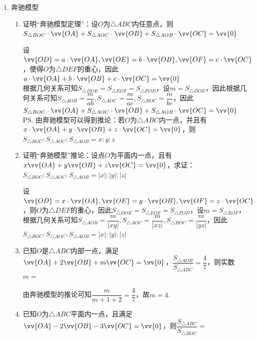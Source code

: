 \begin{enumerate}
\begin{enumerate}
    \end{enumerate}
    \item 奔驰模型
    \begin{enumerate}
        \item 证明“奔驰模型定理”：设$O$为$\triangle ABC$内任意点，则$S_{\triangle BOC} \cdot \vv{OA} + S_{\triangle AOC} \cdot \vv{OB} + S_{\triangle AOB} \cdot \vv{OC} = \vv{0}$
        \begin{jieda}
            设$\vv{OD} = a \cdot \vv{OA}, \vv{OE} = b \cdot \vv{OB}, \vv{OF} = c \cdot \vv{OC}$，使得$O$为$\triangle DEF$的重心，因此$a \cdot \vv{OA} + b \cdot \vv{OB} + c \cdot \vv{OC} = \vv{0}$ \\
            根据几何关系可知$S_{\triangle DOE} = S_{\triangle EOF} = S_{\triangle FOD}$，设$m = S_{\triangle DOE}$，因此根据几何关系可知$S_{\triangle AOB} = \dfrac{m}{ab}, S_{\triangle AOC} = \dfrac{m}{ac}, S_{\triangle BOC} = \dfrac{m}{bc}$，因此$S_{\triangle BOC} \cdot \vv{OA} + S_{\triangle AOC} \cdot \vv{OB} + S_{\triangle AOB} \cdot \vv{OC} = \vv{0}$ \\
            \ps 由奔驰模型可以得到推论：若$O$为$\triangle ABC$内一点，并且有$x \cdot \vv{OA} + y \cdot \vv{OB} + z \cdot \vv{OC} = \vv{0}$，则$S_{\triangle BOC} : S_{\triangle AOC} : S_{\triangle AOB} = x : y : z$
        \end{jieda}
        \item 证明“奔驰模型”推论：设点$O$为平面内一点，且有$x\vv{OA} + y\vv{OB} + z\vv{OC} = \vv{0}$，求证：$S_{\triangle BOC} : S_{\triangle AOC} : S_{\triangle AOB} = |x| : |y| : |z|$
        \begin{jieda}
            设$\vv{OD} = x \cdot \vv{OA}, \vv{OE} = y \cdot \vv{OB}, \vv{OF} = z \cdot \vv{OC}$，则$O$为$\triangle DEF$的重心，因此$S_{\triangle DOE} = S_{\triangle EOF} = S_{\triangle FOD}$，设$m = S_{\triangle EOF}$，根据几何关系可知$S_{\triangle AOB} = \dfrac{m}{|xy|}, S_{\triangle AOC} = \dfrac{m}{|xz|}, S_{\triangle BOC} = \dfrac{m}{|yz|}$，因此$S_{\triangle BOC} : S_{\triangle AOC} : S_{\triangle AOB} = |x| : |y| : |z|$
        \end{jieda}
        \item 已知$O$是$\triangle ABC$内部一点，满足$\vv{OA} + 2\vv{OB} + m\vv{OC} = \vv{0}$，$\dfrac{S_{\triangle AOB}}{S_{\triangle ABC}} = \dfrac{4}{7}$，则实数$m = $
        \begin{jieda}
            由奔驰模型的推论可知$\dfrac{m}{m+1+2} = \dfrac{4}{7}$，故$m = 4$.
        \end{jieda}
        \item 已知$O$为$\triangle ABC$平面内一点，且满足$\vv{OA} - 2\vv{OB} - 3\vv{OC} = \vv{0}$，则$\dfrac{S_{\triangle ABC}}{S_{\triangle BOC}} = $

\end{enumerate}
\end{enumerate}
